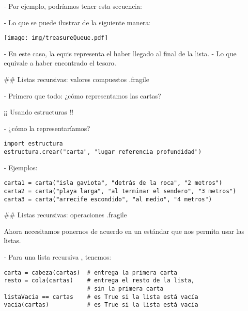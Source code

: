- Por ejemplo, podríamos tener esta secuencia:

\bgnblocknormal
\centering {}
\trmblocknormal

\vfill

- Lo que se puede ilustrar de la siguiente manera:

\centering \texttt{[image: img/treasureQueue.pdf]}

\vfill

- En este caso, la equis representa el haber llegado al final de la lista.
    - Lo que equivale a haber encontrado el tesoro.

## Listas recursivas: valores compuestos {.fragile}

- Primero que todo: ¿cómo representamos las cartas?

\pause

\bgnblockidea
¡¡ Usando estructuras !!
\trmblockidea

\pause

- ¿cómo la representaríamos?

\pause

\begin{lstlisting}[style=frame02]
import estructura
estructura.crear("carta", "lugar referencia profundidad")
\end{lstlisting}

\pause

- Ejemplos:

\begin{lstlisting}[style=frame02]
carta1 = carta("isla gaviota", "detrás de la roca", "2 metros")
carta2 = carta("playa larga", "al terminar el sendero", "3 metros")
carta3 = carta("arrecife escondido", "al medio", "4 metros")
\end{lstlisting}
## Listas recursivas: operaciones {.fragile}

\bgnblockidea
Ahora necesitamos ponernos de acuerdo en un estándar que nos permita usar las listas.
\trmblockidea

\pause

\vfill


- Para una lista recursiva , tenemos:

\begin{lstlisting}
carta = cabeza(cartas)  # entrega la primera carta
resto = cola(cartas)    # entrega el resto de la lista,
                        # sin la primera carta
listaVacia == cartas    # es True si la lista está vacía
vacia(cartas)           # es True si la lista está vacía
\end{lstlisting}

